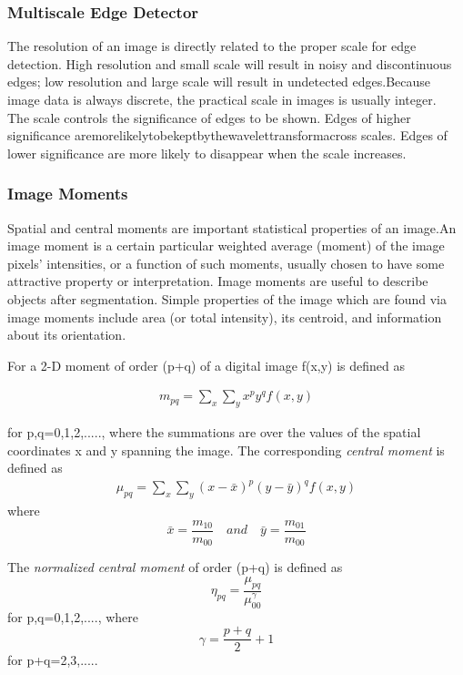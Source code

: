 \subsubsection {Multiscale Edge Detector}
The resolution of an image is directly related to the proper scale for edge detection. High
resolution and small scale will result in noisy and discontinuous edges; low resolution and
large scale will result in undetected edges.Because image data is always discrete, the practical scale in images is usually integer.
\\
The scale controls the significance of edges to be shown. Edges of higher significance
aremorelikelytobekeptbythewavelettransformacross scales. Edges of lower significance
are more likely to disappear when the scale increases.

\subsubsection {Image Moments}
Spatial and central moments are important statistical properties of an image.An image moment is a certain particular weighted average (moment) of the image pixels' intensities, or a function of such moments, usually chosen to have some attractive property or interpretation.
Image moments are useful to describe objects after segmentation. Simple properties of the image which are found via image moments include area (or total intensity), its centroid, and information about its orientation.

\par
For a 2-D moment of order (p+q) of a digital image f(x,y) is defined as

\begin{align}  m_{pq}=  \sum_{x} \sum_{y} x^p y^q f(x,y)  \end{align}
 
for p,q=0,1,2,....., where the summations are over the values of the spatial coordinates x and y spanning the image. The corresponding \emph{central moment} is defined as 
\begin{align} \mu_{pq} = \sum_{x} \sum_{y} (x-\bar{x})^p (y-\bar{y})^q f(x,y) \end{align}
where \[ \bar{x}=\frac{m_{10}}{m_{00}} \quad and \quad \bar{y}=\frac{m_{01}}{m_{00}} \]

\par
The \emph{normalized central moment} of order (p+q) is defined as 
\[  \eta_{pq}=\frac{\mu_{pq}} {\mu_{00}^\gamma} \]
for p,q=0,1,2,...., where 
\[ \gamma=\frac {p+q} {2} +1  \]
for p+q=2,3,.....

